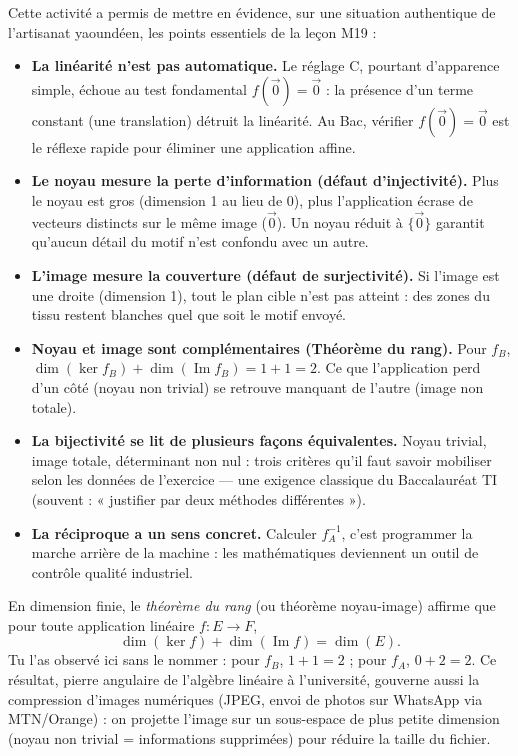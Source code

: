 \documentclass[11pt]{article}
\newcounter{popsec}
\newcounter{popsub}
\newcommand{\courssub}[1]{%
  \stepcounter{popsub}%
  \par\vspace{9pt}\noindent{\popxbold\fontsize{11.5}{13}\selectfont\color{popink}{\color{poporange}\thepopsec.\thepopsub}\hspace{6pt}#1}\par\nopagebreak\vspace{4pt}
}
\begin{document}
\courssub{Bilan de l'activité}

Cette activité a permis de mettre en évidence, sur une situation authentique de l'artisanat yaoundéen, les points essentiels de la leçon M19 :

\begin{itemize}
\item \textbf{La linéarité n'est pas automatique.} Le réglage C, pourtant d'apparence simple, échoue au test fondamental $f(\vec{0}) = \vec{0}$ : la présence d'un terme constant (une translation) détruit la linéarité. Au Bac, vérifier $f(\vec{0})=\vec{0}$ est le réflexe rapide pour éliminer une application affine.
\item \textbf{Le noyau mesure la perte d'information (défaut d'injectivité).} Plus le noyau est \og gros \fg{} (dimension 1 au lieu de 0), plus l'application écrase de vecteurs distincts sur le même image ($\vec{0}$). Un noyau réduit à $\{\vec{0}\}$ garantit qu'aucun détail du motif n'est confondu avec un autre.
\item \textbf{L'image mesure la couverture (défaut de surjectivité).} Si l'image est une droite (dimension 1), tout le plan cible n'est pas atteint : des zones du tissu restent blanches quel que soit le motif envoyé.
\item \textbf{Noyau et image sont complémentaires (Théorème du rang).} Pour $f_B$, $\dim(\ker f_B) + \dim(\operatorname{Im} f_B) = 1 + 1 = 2$. Ce que l'application \og perd \fg{} d'un côté (noyau non trivial) se retrouve \og manquant \fg{} de l'autre (image non totale).
\item \textbf{La bijectivité se lit de plusieurs façons équivalentes.} Noyau trivial, image totale, déterminant non nul : trois critères qu'il faut savoir mobiliser selon les données de l'exercice — une exigence classique du Baccalauréat TI (souvent : « justifier par deux méthodes différentes »).
\item \textbf{La réciproque a un sens concret.} Calculer $f_A^{-1}$, c'est programmer la \og marche arrière \fg{} de la machine : les mathématiques deviennent un outil de contrôle qualité industriel.
\end{itemize}

\begin{savaistu}
En dimension finie, le \emph{théorème du rang} (ou théorème noyau-image) affirme que pour toute application linéaire $f : E \to F$,
\[ \dim(\ker f) + \dim(\operatorname{Im} f) = \dim(E). \]
Tu l'as observé ici sans le nommer : pour $f_B$, $1 + 1 = 2$ ; pour $f_A$, $0 + 2 = 2$. Ce résultat, pierre angulaire de l'algèbre linéaire à l'université, gouverne aussi la compression d'images numériques (JPEG, envoi de photos sur WhatsApp via MTN/Orange) : on projette l'image sur un sous-espace de plus petite dimension (noyau non trivial = informations supprimées) pour réduire la taille du fichier.
\end{savaistu}
\end{document}
